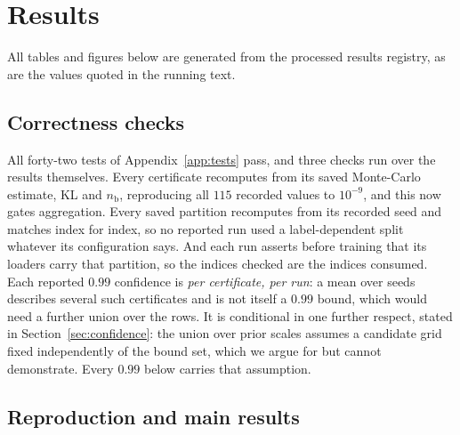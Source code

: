 \section{Results}\label{sec:results}

All tables and figures below are generated from the processed results registry,
as are the values quoted in the running text.

\subsection{Correctness checks}\label{sec:correctness}

All forty-two tests of Appendix~\ref{app:tests} pass, and three checks run over
the results themselves. Every certificate recomputes from its saved Monte-Carlo
estimate, KL and $n_{\mathrm b}$, reproducing all $115$ recorded values to
$10^{-9}$, and this now gates aggregation. Every saved partition recomputes from
its recorded seed and matches index for index, so no reported run used a
label-dependent split whatever its configuration says. And each run asserts
before training that its loaders carry that partition, so the indices checked are
the indices consumed. Each reported $0.99$ confidence is \emph{per certificate,
per run}: a mean over seeds describes several such certificates and is not
itself a $0.99$ bound, which would need a further union over the rows. It is
conditional in one further respect, stated in Section~\ref{sec:confidence}: the
union over prior scales assumes a candidate grid fixed independently of the
bound set, which we argue for but cannot demonstrate. Every $0.99$ below carries
that assumption.

\subsection{Reproduction and main results}\label{sec:main}

\begin{table}\centering
\caption{Headline cells (mean~$\pm$~SD over five seeds). Each run's certificate is
a $0$--$1$ PAC-Bayes-kl bound on the Gibbs risk holding at confidence $0.99$; the
column is the descriptive mean of five such per-run certificates and is not
itself a $0.99$ bound, which would need a further union over the five. The two
test errors are descriptive deployment metrics and carry no guarantee.
$n_{\mathrm b}$ is the bound-set size actually used, which halves for a learnt
prior.}\label{tab:main}

\end{table}

